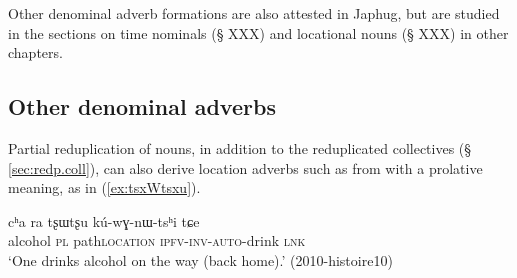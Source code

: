 Other denominal adverb formations are also attested in Japhug, but are studied in the sections on time nominals (§ XXX) and locational nouns (§  XXX) in other chapters.


\subsection{Other denominal adverbs} \label{sec:other.denominal.adverbs}
Partial reduplication of nouns, in addition to the reduplicated collectives (§ \ref{sec:redp.coll}), can also derive location adverbs such as  from  with a prolative meaning, as in (\ref{ex:tsxWtsxu}).

\begin{exe}
\ex \label{ex:tsxWtsxu}
\gll cʰa ra tʂɯ\redp{}tʂu kú-wɣ-nɯ-tsʰi tɕe \\
alcohol \textsc{pl} path\redp{}\textsc{location}  \textsc{ipfv}-\textsc{inv}-\textsc{auto}-drink \textsc{lnk} \\
\glt `One drinks alcohol on the way (back home).' (2010-histoire10)
\end{exe}
